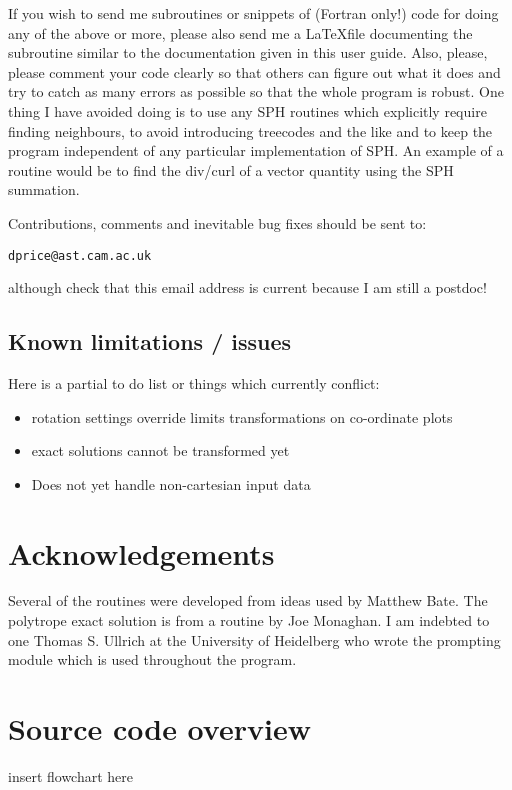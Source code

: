 \documentclass[a4paper,12pt]{article}
\begin{document}
If you wish to send me subroutines or snippets of (Fortran only!) code for doing any of the above or
more, please also send me a \LaTeX file
documenting the subroutine similar to the documentation given in this user guide.
Also, please, please comment your code clearly so that others can figure out
what it does and try to catch as many errors as possible so that the whole
program is robust.  One thing I have avoided doing is to use any SPH
routines which explicitly require finding neighbours, to avoid introducing treecodes and
the like and to keep the program independent of any particular implementation of
SPH. An example of a
routine would be to find the div/curl of a vector quantity using
the SPH summation.

Contributions, comments and inevitable bug fixes
should be sent to:
\begin{verbatim}
dprice@ast.cam.ac.uk
\end{verbatim}
although check that this email address is current because I am still a postdoc!

\subsection{Known limitations / issues}
Here is a partial to do list or things which currently conflict:
\begin{itemize}
\item rotation settings override limits transformations on co-ordinate plots
\item exact solutions cannot be transformed yet
\item Does not yet handle non-cartesian input data
\end{itemize}

\section*{Acknowledgements}
 Several of the routines were developed from ideas used by Matthew Bate. The
polytrope exact solution is from a routine by Joe Monaghan. I am indebted to one
Thomas S. Ullrich at the University of Heidelberg who wrote the prompting module
which is used throughout the program.

\newpage
\appendix


\section{Source code overview}
 insert flowchart here
\end{document}
